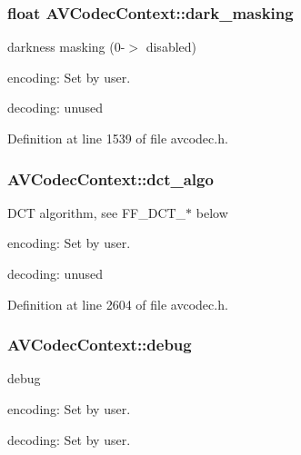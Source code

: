 \subsubsection[{\texorpdfstring{dark\+\_\+masking}{dark_masking}}]{\setlength{\rightskip}{0pt plus 5cm}float A\+V\+Codec\+Context\+::dark\+\_\+masking}\hypertarget{struct_a_v_codec_context_a94bc3962f63a607a7d26d927f9bffb10}{}\label{struct_a_v_codec_context_a94bc3962f63a607a7d26d927f9bffb10}
darkness masking (0-\/$>$ disabled)
\begin{DoxyItemize}
\item encoding\+: Set by user.
\item decoding\+: unused 
\end{DoxyItemize}

Definition at line 1539 of file avcodec.\+h.

\subsubsection[{\texorpdfstring{dct\+\_\+algo}{dct_algo}}]{ A\+V\+Codec\+Context\+::dct\+\_\+algo}\hypertarget{struct_a_v_codec_context_a270c5551611475aebd7f9ce154d7f263}{}\label{struct_a_v_codec_context_a270c5551611475aebd7f9ce154d7f263}
D\+CT algorithm, see F\+F\+\_\+\+D\+C\+T\+\_\+$\ast$ below
\begin{DoxyItemize}
\item encoding\+: Set by user.
\item decoding\+: unused 
\end{DoxyItemize}

Definition at line 2604 of file avcodec.\+h.

\subsubsection[{\texorpdfstring{debug}{debug}}]{ A\+V\+Codec\+Context\+::debug}\hypertarget{struct_a_v_codec_context_a1c52e4da25b608b2b9a80af21bb86d58}{}\label{struct_a_v_codec_context_a1c52e4da25b608b2b9a80af21bb86d58}
debug
\begin{DoxyItemize}
\item encoding\+: Set by user.
\item decoding\+: Set by user. 
\end{DoxyItemize}

